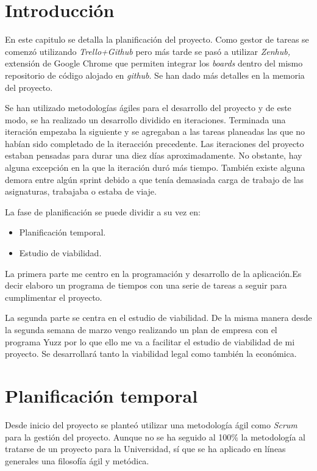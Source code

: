 
\section{Introducción}\label{introduccion-plan}
En este capitulo se detalla la planificación del proyecto. Como gestor de tareas se comenzó utilizando \emph{Trello+Github} pero más tarde se pasó a utilizar \emph{Zenhub,} extensión de Google Chrome que permiten integrar los \emph{boards} dentro del mismo repositorio de código alojado en \emph{github}. Se han dado más detalles en la memoria del proyecto.

Se han utilizado metodologías ágiles para el desarrollo del proyecto y de este modo, se ha realizado un desarrollo dividido en iteraciones. Terminada una iteración empezaba la siguiente y se agregaban a las tareas planeadas las que no habían sido completado de la iteracción precedente. Las iteraciones del proyecto estaban pensadas para durar una diez días aproximadamente. No obstante, hay alguna excepción en la que la iteración duró más tiempo. También existe alguna demora entre algún sprint debido a que tenía demasiada carga de trabajo de las asignaturas, trabajaba o estaba de viaje. 

La fase de planificación se puede dividir a su vez en:

\begin{itemize}
\tightlist
\item
  Planificación temporal.
\item
  Estudio de viabilidad.
\end{itemize} 

La primera parte me centro en la programación y desarrollo de la aplicación.Es decir elaboro un programa de tiempos con una serie de tareas a seguir para cumplimentar el proyecto.

La segunda parte se centra en el estudio de viabilidad. De la misma manera desde la segunda semana de marzo vengo realizando un plan de empresa con el programa Yuzz por lo que ello me va a facilitar el estudio de viabilidad de mi proyecto. Se desarrollará tanto la viabilidad legal como también la económica. 


\section{Planificación temporal}\label{planificacion-temporal}
Desde inicio del proyecto se planteó utilizar una metodología ágil como
\emph{Scrum} para la gestión del proyecto. Aunque no se ha seguido al 100\% la
metodología al tratarse de un proyecto para la Universidad, sí que se ha aplicado
en líneas generales una filosofía ágil y metódica.

